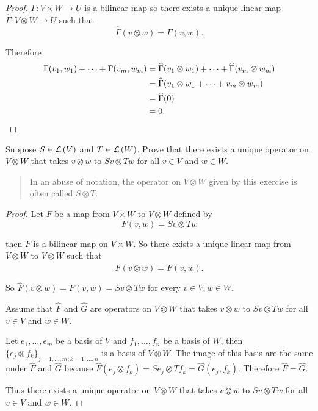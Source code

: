\begin{proof}
    $\Gamma: V\times W\to U$ is a bilinear map so there exists a unique linear map $\widehat{\Gamma}: V\otimes W\to U$ such that
    \[
        \widehat{\Gamma}(v\otimes w) = \Gamma(v, w).
    \]

    Therefore
    \begin{align*}
        \Gamma(v_{1}, w_{1}) + \cdots + \Gamma(v_{m}, w_{m}) & = \widehat{\Gamma}(v_{1}\otimes w_{1}) + \cdots + \widehat{\Gamma}(v_{m}\otimes w_{m}) \\
                                                             & = \widehat{\Gamma}(v_{1}\otimes w_{1} + \cdots + v_{m}\otimes w_{m})                   \\
                                                             & = \widehat{\Gamma}(0)                                                                  \\
                                                             & = 0.\qedhere
    \end{align*}
\end{proof}
\newpage

\begin{exercise}\label{chapter9:sectionD:exercise9}
    Suppose $S\in\mathcal{L}\left({V}\right)$ and $T\in\mathcal{L}\left({W}\right)$. Prove that there exists a unique operator on $V\otimes W$ that takes $v\otimes w$ to $Sv\otimes Tw$ for all $v\in V$ and $w\in W$.
\end{exercise}

\begin{quote}
    In an abuse of notation, the operator on $V \otimes W$ given by this exercise is often called $S\otimes T$.
\end{quote}

\begin{proof}
    Let $F$ be a map from $V\times W$ to $V\otimes W$ defined by
    \[
        F(v, w) = Sv\otimes Tw
    \]

    then $F$ is a bilinear map on $V\times W$. So there exists a unique linear map from $V\otimes W$ to $V\otimes W$ such that
    \[
        \widehat{F}(v\otimes w) = F(v, w).
    \]

    So $\widehat{F}(v\otimes w) = F(v, w) = Sv\otimes Tw$ for every $v\in V, w\in W$.

    Assume that $\widehat{F}$ and $\widehat{G}$ are operators on $V\otimes W$ that takes $v\otimes w$ to $Sv\otimes Tw$ for all $v\in V$ and $w\in W$.

    Let $e_{1}, \ldots, e_{m}$ be a basis of $V$ and $f_{1}, \ldots, f_{n}$ be a basis of $W$, then ${\{ e_{j}\otimes f_{k} \}}_{j=1,\ldots,m;k=1,\ldots,n}$ is a basis of $V\otimes W$. The image of this basis are the same under $\widehat{F}$ and $\widehat{G}$ because $\widehat{F}(e_{j}\otimes f_{k}) = Se_{j}\otimes Tf_{k} = \widehat{G}(e_{j}, f_{k})$. Therefore $\widehat{F} = \widehat{G}$.

    Thus there exists a unique operator on $V\otimes W$ that takes $v\otimes w$ to $Sv\otimes Tw$ for all $v\in V$ and $w\in W$.
\end{proof}
\newpage

